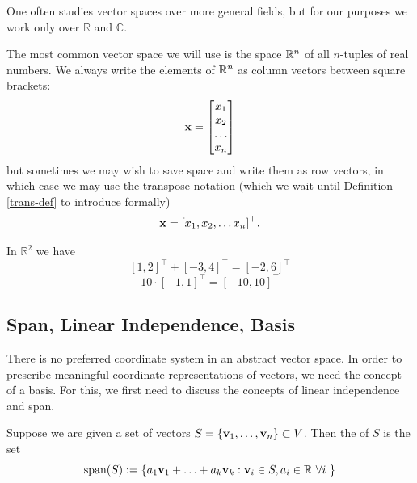 \begin{remark}
    One often studies vector spaces over more general fields, but for our purposes we work only over $\mathbb{R}$ and $\mathbb C$.
\end{remark}

The most common vector space we will use is the space $\R^n$ of all $n$-tuples of real numbers. We always write the elements of $\R^n$ as column vectors between square brackets:
$$\vx = \begin{bmatrix}x_1\\x_2\\\dots\\x_n\end{bmatrix}$$
but sometimes we may wish to save space and write them as row vectors, in which case we may use the transpose notation (which we wait until Definition \ref{trans-def} to introduce formally)
$$\vx = [x_1, x_2, \dots x_n]^\top.$$

\begin{example}
In $\mathbb R^2 $ we have
$$[1,2]^\top + [-3,4]^\top = [-2,6]^\top$$
$$10 \cdot [-1,1]^\top = [-10,10]^\top$$
\end{example}

\subsection{Span, Linear Independence, Basis}

There is no preferred coordinate system in an abstract vector space. In order to prescribe meaningful coordinate representations of vectors, we need the concept of a basis. For this, we first need to discuss the concepts of linear independence and span.

\begin{definition}
Suppose we are given a set of vectors $S = \{\vv_1, \ldots, \vv_n \} \subset V$. Then the  of $S$ is the set 
$$\spann(S) := \{a_1\vv_1 + \ldots + a_k \vv_k : \vv_i \in S, a_i \in \mathbb R \ \forall i \ \}$$
\end{definition}

